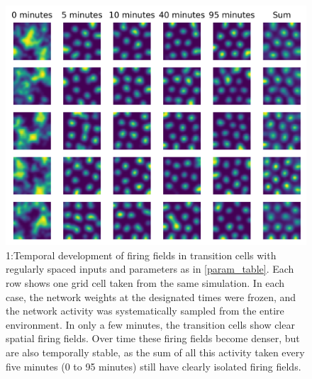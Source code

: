 \documentclass{article}
\begin{document}
    \begin{figure}[H]
        \centering
        \begin{minipage}[b]{12cm}
        \includegraphics[width=\linewidth]{spike_temp_plot.png}
        \caption{1:Temporal development of firing fields in transition cells with regularly spaced inputs and parameters as in \ref{param_table}. Each row shows one grid cell taken from the same simulation. In each case, the network weights at the designated times were frozen, and the network activity was systematically sampled from the entire environment. In only a few minutes, the transition cells show clear spatial firing fields. Over time these firing fields become denser, but are also temporally stable, as the sum of all this activity taken every five minutes (0 to 95 minutes) still have clearly isolated firing fields.}
        \label{spike_temp_plot}
        \end{minipage}
    \end{figure}
\end{document}
